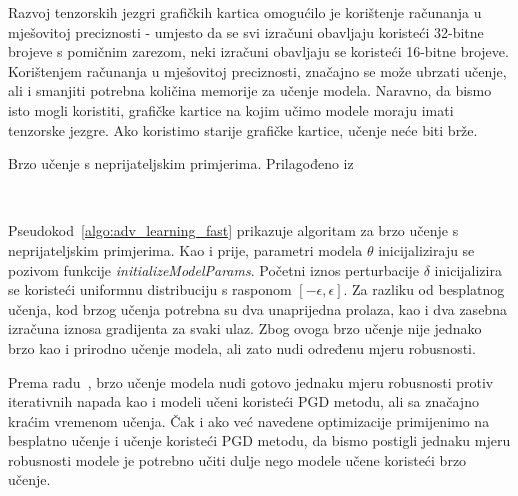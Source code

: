 \documentclass[times, utf8, zavrsni, numeric]{fer}
\begin{document}
Razvoj tenzorskih jezgri grafičkih kartica omogućilo je korištenje računanja u mješovitoj preciznosti - 
umjesto da se svi izračuni obavljaju koristeći 32-bitne brojeve s pomičnim zarezom, neki izračuni obavljaju se koristeći 16-bitne brojeve.
Korištenjem računanja u mješovitoj preciznosti, značajno se može ubrzati učenje, ali i smanjiti potrebna količina memorije za učenje modela.
Naravno, da bismo isto mogli koristiti, grafičke kartice na kojim učimo modele moraju imati tenzorske jezgre. Ako koristimo starije grafičke kartice, učenje neće biti brže.

\begin{algorithm}
    \caption{Brzo učenje s neprijateljskim primjerima. Prilagođeno iz~\cite{wong2020fast}}
    \label{algo:adv_learning_fast}
    \begin{algorithmic}
        \\\hrulefill
            \ENDFOR
        \ENDFOR
    \end{algorithmic}
\end{algorithm}

Pseudokod~\ref{algo:adv_learning_fast} prikazuje algoritam za brzo učenje s neprijateljskim primjerima.
Kao i prije, parametri modela $\theta$ inicijaliziraju se pozivom funkcije \textit{initializeModelParams}.
Početni iznos perturbacije $\delta$ inicijalizira se koristeći uniformnu distribuciju s rasponom $[-\epsilon, \epsilon]$.
Za razliku od besplatnog učenja, kod brzog učenja potrebna su dva unaprijedna prolaza, kao i dva zasebna izračuna iznosa gradijenta za svaki ulaz.
Zbog ovoga brzo učenje nije jednako brzo kao i prirodno učenje modela, ali zato nudi određenu mjeru robusnosti.

Prema radu~\cite{wong2020fast}, brzo učenje modela nudi gotovo jednaku mjeru robusnosti protiv iterativnih napada kao i modeli učeni koristeći PGD metodu, 
ali sa značajno kraćim vremenom učenja. Čak i ako već navedene optimizacije primijenimo na besplatno učenje i učenje koristeći PGD metodu, 
da bismo postigli jednaku mjeru robusnosti modele je potrebno učiti dulje nego modele učene koristeći brzo učenje.
\end{document}

